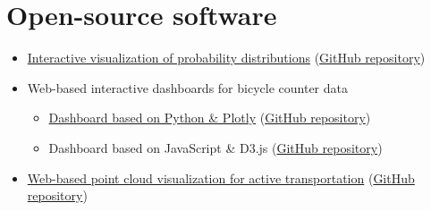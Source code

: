 \documentclass[11pt]{article}
\newenvironment{main}
{\begin{adjustwidth}{3em}{}}
{\end{adjustwidth}}
\begin{document}
\section*{Open-source software}
\begin{main}

\begin{itemize}
    \item \href{https://probstats.org/}{Interactive visualization of probability distributions} (\href{https://github.com/probstats/probstats.github.io}{GitHub repository})
    \item Web-based interactive dashboards for bicycle counter data
            \begin{itemize}
                \item \href{https://bikecounter.org/}{Dashboard based on Python \& Plotly} (\href{https://github.com/fenggroup/bike-traffic-plotly-dash}{GitHub repository})
                \item Dashboard based on JavaScript \& D3.js (\href{https://github.com/fenggroup/bike-counter-d3}{GitHub repository})
            \end{itemize}
    \item \href{https://fenggroup.org/pointcloud/examples/bike-2.html}{Web-based point cloud visualization for active transportation} (\href{https://github.com/fenggroup/pointcloud}{GitHub repository})
\end{itemize}

\end{main}
\end{document}
